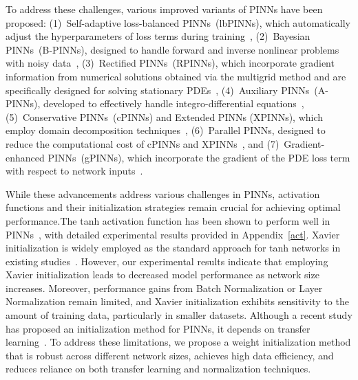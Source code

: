 \documentclass{article} \usepackage{iclr2025_conference,times}
\begin{document}
To address these challenges, various improved variants of PINNs have been proposed: 
(1)~Self-adaptive loss-balanced PINNs~(lbPINNs), which automatically adjust the hyperparameters of loss terms during training~\citep{XIANG202211},
(2)~Bayesian PINNs~(B-PINNs), designed to handle forward and inverse nonlinear problems with noisy data~\citep{YANG2021109913},
(3)~Rectified PINNs~(RPINNs), which incorporate gradient information from numerical solutions obtained via the multigrid method and are specifically designed for solving stationary PDEs~\citep{PENG2022105583},
(4)~Auxiliary PINNs~(A-PINNs), developed to effectively handle integro-differential equations~\citep{YUAN2022111260},
(5)~Conservative PINNs~(cPINNs) and Extended PINNs (XPINNs), which employ domain decomposition techniques~\citep{JAGTAP2020113028, Jagtap2020ExtendedPN},
(6)~Parallel PINNs, designed to reduce the computational cost of cPINNs and XPINNs~\citep{SHUKLA2021110683}, and
(7)~Gradient-enhanced PINNs~(gPINNs), which incorporate the gradient of the PDE loss term with respect to network inputs~\citep{YU2022114823}.


While these advancements address various challenges in PINNs, activation functions and their initialization strategies remain crucial for achieving optimal performance.The tanh activation function has been shown to perform well in PINNs~\citep{raissi2019physics}, with detailed experimental results provided in Appendix~\ref{act}.
Xavier initialization is widely employed as the standard approach for tanh networks in existing studies~\citep{jin2021nsfnets, son2023enhanced, yao2023multiadam, gnanasambandam2023self, song2024loss}.
However, our experimental results indicate that employing Xavier initialization leads to decreased model performance as network size increases. Moreover, performance gains from Batch Normalization or Layer Normalization remain limited, and Xavier initialization exhibits sensitivity to the amount of training data, particularly in smaller datasets.
Although a recent study has proposed an initialization method for PINNs, it depends on transfer learning~\citep{tarbiyati2023weight}.
To address these limitations, we propose a weight initialization method that is robust across different network sizes, achieves high data efficiency, and reduces reliance on both transfer learning and normalization techniques.
\end{document}
